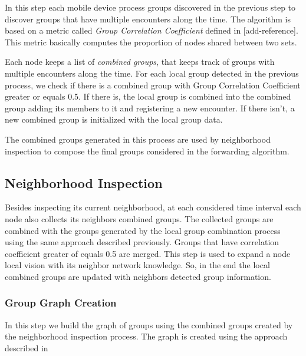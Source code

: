 In this step each mobile device process groups discovered in the previous step to discover groups that
have multiple encounters along the time. The algorithm is based on a metric called \textit{Group Correlation Coefficient} defined in [add-reference]. This metric basically computes the proportion of nodes shared between two sets. 

Each node keeps a list of \textit{combined groups}, that keeps track of groups with multiple encounters along the time. For each
local group detected in the previous process, we check if there is a combined group with Group Correlation Coefficient greater or equals 0.5.
If there is, the local group is combined into the combined group adding its members to it and registering a new encounter. If there isn't, a new combined group is initialized with the local group data.

The combined groups generated in this process are used by neighborhood inspection to compose the final groups considered in the forwarding algorithm.

\subsection{Neighborhood Inspection}

Besides inspecting its current neighborhood, at each considered time interval each node also collects its neighbors combined groups. The collected groups are combined with the groups generated by the local group combination process using the same approach described previously. Groups that have correlation coefficient greater of equals 0.5 are merged. This step is used to expand a node local vision with its neighbor
network knowledge. So, in the end the local combined groups are updated with neighbors detected group information.

\subsubsection{Group Graph Creation}

In this step we build the graph of groups using the combined groups created by the neighborhood inspection process. The graph is created using the approach described in \cite{groupMobility}